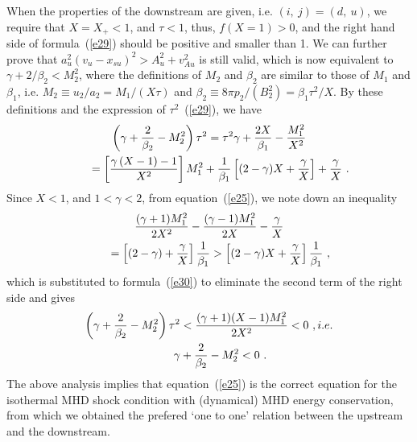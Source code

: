 \documentclass[fleqn,usenatbib]{mnras}
\begin{document}
When the properties of the downstream are given, i.e. $(i,\ j)=(d,\ u)$, we require that $X=X_{+}<1$, and $\tau<1$, thus, $f(X=1)>0$, and the right hand side of formula~(\ref{e29}) should be positive and smaller than 1. We can further prove that $a_{u}^{2}\left(v_{u}-x_{su}\right)^{2}>A_{u}^{2}+v_{Au}^{2}$ is still valid, which is now equivalent to $\gamma+2/\beta_{2}<M_{2}^{2}$, where the definitions of $M_{2}$ and $\beta_{2}$ are similar to those of $M_{1}$ and $\beta_{1}$, i.e. $M_{2}\equiv u_{2}/a_{2}=M_{1}/(X\tau)$ and $\beta_{2}\equiv 8\pi p_{2}/\left(B_{2}^{2}\right)=\beta_{1}\tau^{2}/X$. By these definitions and the expression of $\tau^{2}$~(\ref{e29}), we have
\begin{gather}
\left(\gamma+\frac{2}{\beta_{2}}-M_{2}^{2}\right)\tau^{2}=\tau^{2}\gamma+\frac{2X}{\beta_{1}}-\frac{M_{1}^{2}}{X^{2}}\notag\\
\qquad =\left[\frac{\gamma\left(X-1\right)-1}{X^{2}}\right]M_{1}^{2}+\frac{1}{\beta_{1}}\left[(2-\gamma)X+\frac{\gamma}{X}\right]+\frac{\gamma}{X}\ .\label{e30}
\end{gather}
Since $X<1$, and $1<\gamma<2$, from equation~(\ref{e25}), we note down an inequality
\begin{gather}
\frac{(\gamma+1)M_{1}^2}{2X^{2}}-\frac{(\gamma-1)M_{1}^{2}}{2X}-\frac{\gamma}{X}\notag\\
\qquad =\left[(2-\gamma)+\frac{\gamma}{X}\right]\frac{1}{\beta_{1}}> \left[(2-\gamma)X+\frac{\gamma}{X}\right]\frac{1}{\beta_{1}}\ ,\label{e31}
\end{gather}
which is substituted to formula~(\ref{e30}) to eliminate the second term of the right side and gives
\begin{gather}
\left(\gamma+\frac{2}{\beta_{2}}-M_{2}^{2}\right)\tau^{2}<\frac{(\gamma+1)(X-1)M_{1}^{2}}{2X^{2}}<0\ ,i.e.\notag\\
\qquad \gamma+\frac{2}{\beta_{2}}-M_{2}^{2}<0\ .\label{e32}
\end{gather}
The above analysis implies that equation~(\ref{e25}) is the correct equation for the isothermal MHD shock condition with (dynamical) MHD energy conservation, from which we obtained the prefered `one to one' relation between the upstream and the downstream.
\end{document}

